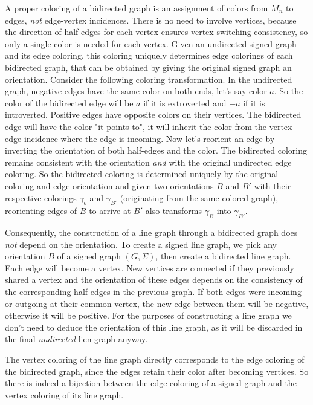 A proper coloring of a bidirected graph is an assignment of colors from $M_n$ to edges, \textit{not} edge-vertex incidences. 
There is no need to involve vertices, because the direction of half-edges for each vertex ensures vertex switching consistency, so only a single color is needed for each vertex.
Given an undirected signed graph and its edge coloring, this coloring uniquely determines edge colorings of each bidirected graph, that can be obtained by giving the original signed graph an orientation.
Consider the following coloring transformation. In the undirected graph, negative edges have the same color on both ends, let's say color $a$. So the color of the bidirected edge will be $a$ if it is extroverted and $-a$ if it is introverted.
Positive edges have opposite colors on their vertices. The bidirected edge will have the color "it points to", it will inherit the color from the vertex-edge incidence where the edge is incoming.
Now let's reorient an edge by inverting the orientation of both half-edges and the color. The bidirected coloring remains consistent with the orientation \textit{and} with the original undirected edge coloring.
So the bidirected coloring is determined uniquely by the original coloring and edge orientation and given two orientations $B$ and $B'$ with their respective colorings $\gamma _b$ and $\gamma _{B'}$ (originating from the same colored graph),
reorienting edges of $B$ to arrive at $B'$ also transforms $\gamma _B$ into $\gamma _{B'}$.

Consequently, the construction of a line graph through a bidirected graph does \textit{not} depend on the orientation. To create a signed line graph,
we pick any orientation $B$ of a signed graph $(G, \Sigma)$, then create a bidirected line graph. Each edge will become a vertex.
New vertices are connected if they previously shared a vertex and the orientation of these edges depends on the consistency of the corresponding half-edges in the previous graph.
If both edges were incoming or outgoing at their common vertex, the new edge between them will be negative, otherwise it will be positive. 
For the purposes of constructing a line graph we don't need to deduce the orientation of this line graph, as it will be discarded in the final \textit{undirected} lien graph anyway.

The vertex coloring of the line graph directly corresponds to the edge coloring of the bidirected graph, since the edges retain their color after becoming vertices.
So there is indeed a bijection between the edge coloring of a signed graph and the vertex coloring of its line graph.
